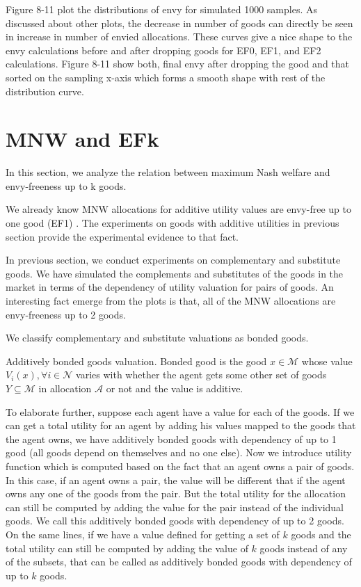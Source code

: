 Figure 8-11 plot the distributions of envy for simulated 1000 samples. As discussed about other plots, the decrease in number of goods can directly be seen in increase in number of envied allocations. These curves give a nice shape to the envy calculations before and after dropping goods for EF0, EF1, and EF2 calculations. Figure 8-11 show both, final envy after dropping the good and that sorted on the sampling x-axis which forms a smooth shape with rest of the distribution curve.


\section{MNW and EFk}
\label{section_proof}
In this section, we analyze the relation between maximum Nash welfare and envy-freeness up to k goods.

We already know MNW allocations for additive utility values are envy-free up to one good (EF1) \cite{caragiannis2016unreasonable}. The experiments on goods with additive utilities in previous section provide the experimental evidence to that fact.

In previous section, we conduct experiments on complementary and substitute goods. We have simulated the complements and substitutes of the goods in the market in terms of the dependency of utility valuation for pairs of goods. An interesting fact emerge from the plots is that, all of the MNW allocations are envy-freeness up to 2 goods.

We classify complementary and substitute valuations as bonded goods.

\begin{definition}{Additively bonded goods valuation.}
Bonded good is the good $x \in \mathcal{M}$ whose value $V_i(x), \forall i \in \mathcal{N}$ varies with whether the agent gets some other set of goods $Y \subseteq \mathcal{M}$ in allocation $\mathcal{A}$ or not and the value is additive.
\end{definition}

To elaborate further, suppose each agent have a value for each of the goods. If we can get a total utility for an agent by adding his values mapped to the goods that the agent owns, we have additively bonded goods with dependency of up to 1 good (all goods depend on themselves and no one else). Now we introduce utility function which is computed based on the fact that an agent owns a pair of goods. In this case, if an agent owns a pair, the value will be different that if the agent owns any one of the goods from the pair. But the total utility for the allocation can still be computed by adding the value for the pair instead of the individual goods. We call this additively bonded goods with dependency of up to 2 goods. On the same lines, if we have a value defined for getting a set of $k$ goods and the total utility can still be computed by adding the value of $k$ goods instead of any of the subsets, that can be called as additively bonded goods with dependency of up to $k$ goods.

